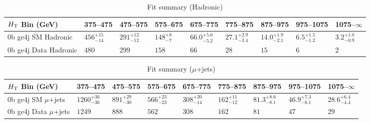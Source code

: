 \documentclass[8pt]{article}
\def\scalht{\mbox{$H_{\rm{T}}$}\xspace}
\newcommand\T{\rule{0pt}{2.6ex}}
\begin{document}
\begin{table}[ht!]
\caption{Fit summary (Hadronic)}
\label{tab:ensemble-summary}
\centering
\begin{tabular}{ lllllllll }

\hline
\scalht Bin (GeV)       & 375--475                       & 475--575                       & 575--675                       & 675--775                       & 775--875                       & 875--975                       & 975--1075                      & 1075--$\infty$                 \\ [1.000000ex]
\hline
0b ge4j SM Hadronic\T   & $456^{+15}_{-14}$              & $291^{+12}_{-12}$              & $148^{+8}_{-7}$                & $66.0^{+5.6}_{-5.2}$           & $27.1^{+2.9}_{-3.4}$           & $14.0^{+1.9}_{-2.1}$           & $6.5^{+1.5}_{-1.2}$            & $3.2^{+1.0}_{-0.9}$            \\ 
0b ge4j Data Hadronic\T & $480$                          & $299$                          & $158$                          & $66$                           & $28$                           & $15$                           & $6$                            & $2$                            \\ 
\hline

\end{tabular}
\end{table}
\begin{table}[ht!]
\caption{Fit summary ($\mu$+jets)}
\label{tab:ensemble-summary}
\centering
\begin{tabular}{ lllllllll }

\hline
\scalht Bin (GeV)       & 375--475                       & 475--575                       & 575--675                       & 675--775                       & 775--875                       & 875--975                       & 975--1075                      & 1075--$\infty$                 \\ [1.000000ex]
\hline
0b ge4j SM $\mu$+jets\T & $1260^{+36}_{-36}$             & $891^{+29}_{-30}$              & $566^{+23}_{-23}$              & $308^{+20}_{-14}$              & $162^{+11}_{-12}$              & $81.3^{+8.6}_{-8.1}$           & $46.9^{+7.3}_{-6.1}$           & $28.6^{+6.4}_{-4.4}$           \\ 
0b ge4j Data $\mu$+jets\T & $1249$                         & $888$                          & $562$                          & $308$                          & $162$                          & $81$                           & $47$                           & $29$                           \\ 
\hline

\end{tabular}
\end{table}
\end{document}
